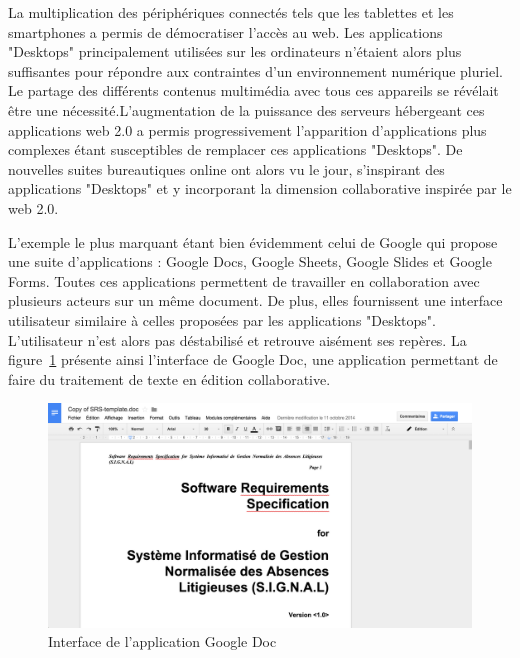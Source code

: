 \documentclass{tnreport}
\begin{document}
La multiplication des périphériques connectés tels que les tablettes et les smartphones a permis de démocratiser l'accès au web. 
Les applications "Desktops" principalement utilisées sur les ordinateurs n'étaient alors plus suffisantes pour répondre aux contraintes
d'un environnement numérique pluriel. Le partage des différents contenus multimédia avec tous ces appareils se révélait être une 
nécessité.L'augmentation de la puissance des serveurs hébergeant ces applications web 2.0 a permis progressivement l'apparition 
d'applications plus complexes étant susceptibles de remplacer ces applications "Desktops". De nouvelles suites bureautiques online ont alors 
vu le jour, s'inspirant des applications "Desktops" et y incorporant la dimension collaborative inspirée par le web 2.0. 

L'exemple le plus marquant étant bien évidemment celui de Google qui propose une suite d'applications : Google Docs, Google Sheets, 
Google Slides et Google Forms. Toutes ces applications permettent de travailler en collaboration avec plusieurs acteurs sur un même 
document. De plus, elles fournissent une interface utilisateur similaire à celles proposées par les applications "Desktops". 
L'utilisateur n'est alors pas déstabilisé et retrouve aisément ses repères. La figure~\ref{fig:g-doc} présente ainsi l'interface de 
Google Doc, une application permettant de faire du traitement de texte en édition collaborative.


\begin{figure}[h]
  \centering
  \includegraphics[width=15cm]{figures/gdoc}
  \caption{Interface de l'application Google Doc}
  \label{fig:g-doc}
\end{figure}
\end{document}

